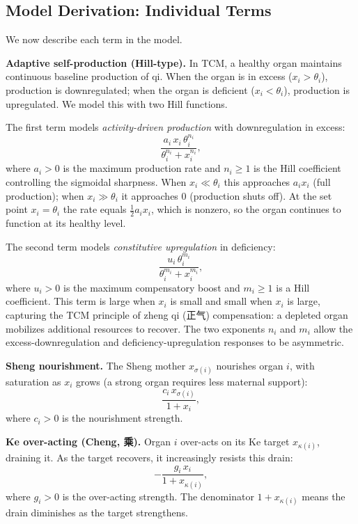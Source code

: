 \documentclass{article}
\begin{document}
\subsection{Model Derivation: Individual Terms}

We now describe each term in the model.

\medskip
\noindent\textbf{Adaptive self-production (Hill-type).}
In TCM, a healthy organ maintains continuous baseline production of qi. When the
organ is in excess ($x_i > \theta_i$), production is downregulated; when the organ
is deficient ($x_i < \theta_i$), production is upregulated. We model this with
two Hill functions.

The first term models \emph{activity-driven production} with downregulation in excess:
\[
    \frac{a_i\, x_i\, \theta_i^{n_i}}{\theta_i^{n_i} + x_i^{n_i}},
\]
where $a_i > 0$ is the maximum production rate and $n_i \geq 1$ is the Hill
coefficient controlling the sigmoidal sharpness. When $x_i \ll \theta_i$ this
approaches $a_i x_i$ (full production); when $x_i \gg \theta_i$ it approaches $0$
(production shuts off). At the set point $x_i = \theta_i$ the rate equals
$\tfrac{1}{2}a_i x_i$, which is nonzero, so the organ continues to function at
its healthy level.

The second term models \emph{constitutive upregulation} in deficiency:
\[
    \frac{u_i\, \theta_i^{m_i}}{\theta_i^{m_i} + x_i^{m_i}},
\]
where $u_i > 0$ is the maximum compensatory boost and $m_i \geq 1$ is a Hill
coefficient. This term is large when $x_i$ is small and small when $x_i$ is large,
capturing the TCM principle of zheng qi (正气) compensation: a depleted organ
mobilizes additional resources to recover. The two exponents $n_i$ and $m_i$
allow the excess-downregulation and deficiency-upregulation responses to be
asymmetric.

\medskip
\noindent\textbf{Sheng nourishment.}
The Sheng mother $x_{\sigma(i)}$ nourishes organ $i$, with saturation as $x_i$
grows (a strong organ requires less maternal support):
\[
    \frac{c_i\, x_{\sigma(i)}}{1 + x_i},
\]
where $c_i > 0$ is the nourishment strength.

\medskip
\noindent\textbf{Ke over-acting (Cheng, 乘).}
Organ $i$ over-acts on its Ke target $x_{\kappa(i)}$, draining it. As the target
recovers, it increasingly resists this drain:
\[
    -\frac{g_i\, x_i}{1 + x_{\kappa(i)}},
\]
where $g_i > 0$ is the over-acting strength. The denominator $1 + x_{\kappa(i)}$
means the drain diminishes as the target strengthens.
\end{document}
